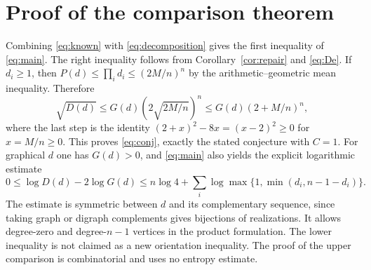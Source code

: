\documentclass[11pt]{article}
\theoremstyle{remark}\newtheorem{remark}[theorem]{Remark}
\begin{document}
\section{Proof of the comparison theorem}
Combining \eqref{eq:known} with \eqref{eq:decomposition} gives the first inequality of \eqref{eq:main}. The right inequality follows from Corollary~\ref{cor:repair} and \eqref{eq:De}. If $d_i\ge1$, then $P(d)\le\prod_i d_i\le(2M/n)^n$ by the arithmetic--geometric mean inequality. Therefore
\[
 \sqrt{D(d)}\le G(d)\left(2\sqrt{2M/n}\right)^n\le G(d)(2+M/n)^n,
\]
where the last step is the identity $(2+x)^2-8x=(x-2)^2\ge0$ for $x=M/n\ge0$. This proves \eqref{eq:conj}, exactly the stated conjecture with $C=1$. For graphical $d$ one has $G(d)>0$, and \eqref{eq:main} also yields the explicit logarithmic estimate
\[
 0\le\log D(d)-2\log G(d)\le n\log4+\sum_i\log\max\{1,\min(d_i,n-1-d_i)\}.
\]
The estimate is symmetric between $d$ and its complementary sequence, since taking graph or digraph complements gives bijections of realizations. It allows degree-zero and degree-$n-1$ vertices in the product formulation. The lower inequality is not claimed as a new orientation inequality. The proof of the upper comparison is combinatorial and uses no entropy estimate.
\end{document}

